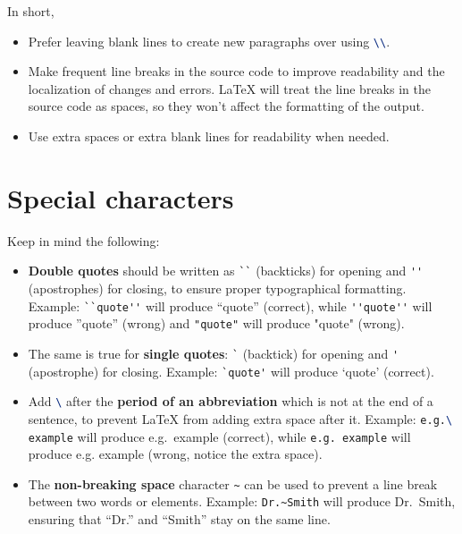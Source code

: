 In short,
\begin{itemize}
    \item Prefer leaving blank lines to create new paragraphs over using \lstinline[language=TeX]|\\|.
    \item Make frequent line breaks in the source code to improve readability and the localization of changes and errors. \LaTeX{} will treat the line breaks in the source code as spaces, so they won't affect the formatting of the output.
    \item Use extra spaces or extra blank lines for readability when needed.
\end{itemize}

\section{Special characters}

Keep in mind the following:
\begin{itemize}
    \item \textbf{Double quotes} should be written as \lstinline[language=TeX]|``| (backticks) for opening and \lstinline[language=TeX]|''| (apostrophes) for closing, to ensure proper typographical formatting.
    Example: \lstinline[language=TeX]|``quote''| will produce ``quote'' (correct), while \lstinline[language=TeX]|''quote''| will produce ''quote'' (wrong) and \lstinline[language=TeX]|"quote"| will produce "quote" (wrong).
    \item The same is true for \textbf{single quotes}: \lstinline[language=TeX]|`| (backtick) for opening and \lstinline[language=TeX]|'| (apostrophe) for closing.
    Example: \lstinline[language=TeX]|`quote'| will produce `quote' (correct).
    \item Add \lstinline[language=TeX]|\| after the \textbf{period of an abbreviation} which is not at the end of a sentence, to prevent \LaTeX{} from adding extra space after it.
    Example: \lstinline[language=TeX]|e.g.\ example| will produce e.g.\ example (correct), while \lstinline[language=TeX]|e.g. example| will produce e.g. example (wrong, notice the extra space).
    \item The \textbf{non-breaking space} character \lstinline[language=TeX]|~| can be used to prevent a line break between two words or elements.
    Example: \lstinline[language=TeX]|Dr.~Smith| will produce Dr.~Smith, ensuring that ``Dr.'' and ``Smith'' stay on the same line.
\end{itemize}

